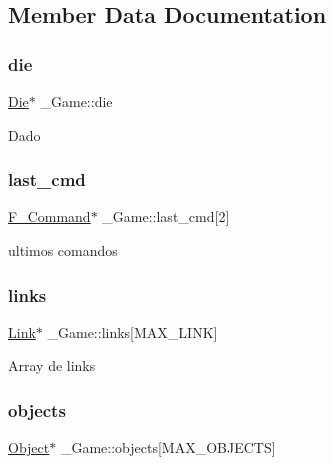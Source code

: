 \subsection{Member Data Documentation}
\mbox{\label{struct__Game_a0d6009b5dcb080489c192a9198fa7d46}} 
\subsubsection{\texorpdfstring{die}{die}}
{\footnotesize\ttfamily \hyperlink{die_8h_a892f0b0bf81d69a1f7a14ea238e36dd3}{Die}$\ast$ \+\_\+\+Game\+::die}

Dado \mbox{\label{struct__Game_a60dec64e55c5cf61b0711a11a62d18c2}} 
\subsubsection{\texorpdfstring{last\+\_\+cmd}{last\_cmd}}
{\footnotesize\ttfamily \hyperlink{struct__F__Command}{F\+\_\+\+Command}$\ast$ \+\_\+\+Game\+::last\+\_\+cmd\mbox{[}2\mbox{]}}

ultimos comandos \mbox{\label{struct__Game_aa4ff88aaf2a54616e5863609effad94e}} 
\subsubsection{\texorpdfstring{links}{links}}
{\footnotesize\ttfamily \hyperlink{struct__Link}{Link}$\ast$ \+\_\+\+Game\+::links\mbox{[}M\+A\+X\+\_\+\+L\+I\+NK\mbox{]}}

Array de links \mbox{\label{struct__Game_ad45bf5645a26e546d0060a2e61f9cf81}} 
\subsubsection{\texorpdfstring{objects}{objects}}
{\footnotesize\ttfamily \hyperlink{struct__Object}{Object}$\ast$ \+\_\+\+Game\+::objects\mbox{[}M\+A\+X\+\_\+\+O\+B\+J\+E\+C\+TS\mbox{]}}


